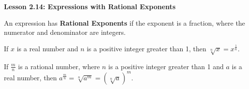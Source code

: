 \begin{center}
\textbf{Lesson 2.14: Expressions with Rational Exponents}
\end{center}

\vspace*{1ex}

An expression has \textbf{Rational Exponents} if the exponent is a fraction, where the numerator and denominator are integers. 

If $x$  is a real number and $n$ is a positive integer greater than 1, then $\sqrt[n]{x} = x^{\tfrac{1}{n}}$.

If $\tfrac{m}{n}$ is a rational number, where $n$ is a positive integer greater than 1 and  $a$ is a real number, then $a^{\tfrac{m}{n}} = \sqrt[\scriptstyle n]{a^m} = (\sqrt[\scriptstyle n]{a})^m$.


